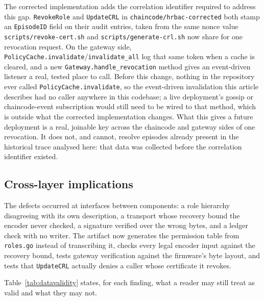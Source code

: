 \documentclass[a4paper,fleqn]{cas-sc}
\begin{document}
The corrected implementation adds the correlation identifier required to address this gap. \texttt{RevokeRole} and
\texttt{UpdateCRL} in \texttt{chaincode/hrbac-corrected} both stamp an
\texttt{EpisodeID} field on their audit entries, taken from the same nonce
value \texttt{scripts/revoke-cert.sh} and \texttt{scripts/generate-crl.sh}
now share for one revocation request. On the gateway side,
\texttt{PolicyCache.invalidate}/\texttt{invalidate\_all} log that same
token when a cache is cleared, and a new \texttt{Gateway.handle\_revocation}
method gives an event-driven listener a real, tested place to call. Before
this change, nothing in the repository ever called
\texttt{PolicyCache.invalidate}, so the event-driven invalidation this
article describes had no caller anywhere in this codebase; a live
deployment's gossip or chaincode-event subscription would still need to be
wired to that method, which is outside what the corrected implementation changes. What
this gives a future deployment is a real, joinable key across the
chaincode and gateway sides of one revocation. It does not, and cannot,
resolve episodes already present in the historical trace analysed here:
that data was collected before the correlation identifier existed.

\subsection{Cross-layer implications}
\label{subsec:pm_pattern}

The defects occurred at interfaces between components: a role hierarchy
disagreeing with its own description, a transport whose recovery bound the
encoder never checked, a signature verified over the wrong bytes, and a
ledger check with no writer. The artifact now generates the permission
table from \texttt{roles.go} instead of transcribing it, checks every legal
encoder input against the recovery bound, tests gateway verification
against the firmware's byte layout, and tests that \texttt{UpdateCRL}
actually denies a caller whose certificate it revokes.

Table~\ref{tab:datavalidity} states, for each finding, what a reader may
still treat as valid and what they may not.
\end{document}
